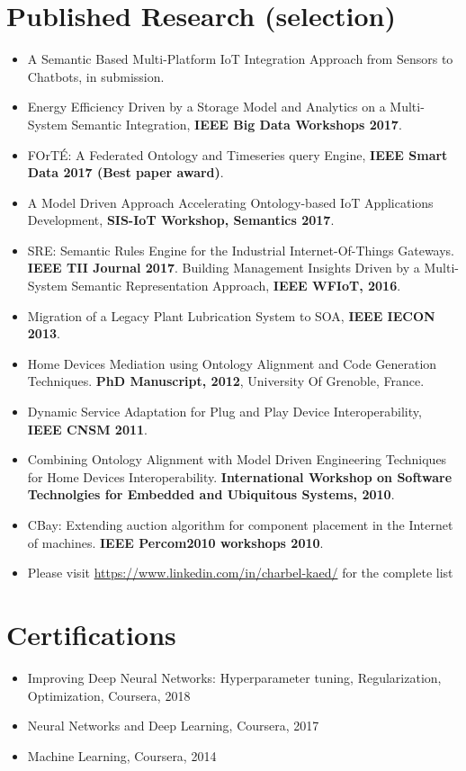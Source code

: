 \documentclass[letterpaper]{twentysecondcv} %
\begin{document}
\section{Published Research (selection)}
\begin{itemize}
\item A Semantic Based Multi-Platform IoT Integration Approach from Sensors to Chatbots, in submission.
\item Energy Efficiency Driven by a Storage Model and Analytics on a Multi-System Semantic Integration, \textbf{IEEE Big Data Workshops 2017}.
\item FOrTÉ: A Federated Ontology and Timeseries query Engine, \textbf{IEEE Smart Data 2017 (Best paper award)}.
\item A Model Driven Approach Accelerating Ontology-based IoT Applications Development, \textbf{SIS-IoT Workshop, Semantics 2017}.
\item SRE: Semantic Rules Engine for the Industrial Internet-Of-Things Gateways. \textbf{IEEE TII Journal 2017}.
Building Management Insights Driven by a Multi-System Semantic Representation Approach, \textbf{IEEE WFIoT, 2016}.
\item Migration of a Legacy Plant Lubrication System to SOA, \textbf{IEEE IECON 2013}.
\item Home Devices Mediation using Ontology Alignment and Code Generation Techniques. \textbf{PhD Manuscript, 2012}, University Of Grenoble, France.
\item Dynamic Service Adaptation for Plug and Play Device Interoperability, \textbf{IEEE CNSM 2011}.
\item Combining Ontology Alignment with Model Driven Engineering Techniques for Home Devices Interoperability. \textbf{International Workshop on Software Technolgies for Embedded and Ubiquitous Systems, 2010}.
\item CBay: Extending auction algorithm for component placement in the Internet of machines. \textbf{IEEE Percom2010 workshops 2010}.

\item Please visit \href{https://www.linkedin.com/in/charbel-kaed/}{https://www.linkedin.com/in/charbel-kaed/} for the complete list
\end{itemize}

\section{Certifications}
\begin{itemize}
\item Improving Deep Neural Networks: Hyperparameter tuning, Regularization, Optimization, Coursera, 2018
\item Neural Networks and Deep Learning, Coursera, 2017
\item Machine Learning, Coursera, 2014
\end{itemize}
\end{document}
